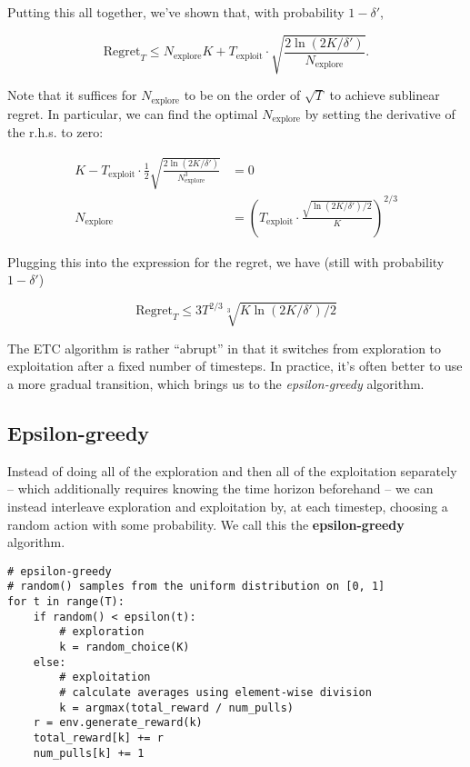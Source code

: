 \documentclass[../main/main]{subfiles}
\begin{document}
Putting this all together, we've shown that, with probability $1 - \delta'$,

\[
    \text{Regret}_T \le N_{\text{explore}} K + T_{\text{exploit}} \cdot \sqrt{\frac{2\ln(2K/\delta')}{N_{\text{explore}}}}.
\]

Note that it suffices for $N_{\text{explore}}$ to be on the order of $\sqrt{T}$ to achieve sublinear regret. In particular, we can find the optimal $N_{\text{explore}}$ by setting the derivative of the r.h.s. to zero:

\begin{align*}
    K - T_{\text{exploit}} \cdot \frac{1}{2} \sqrt{\frac{2\ln(2K/\delta')}{N_{\text{explore}}^3}} &= 0 \\
    N_{\text{explore}} &= \left( T_{\text{exploit}} \cdot \frac{\sqrt{\ln(2K/\delta')/2}}{K} \right)^{2/3}
\end{align*}

Plugging this into the expression for the regret, we have (still with probability $1-\delta'$)

\[
    \text{Regret}_T \le 3 T^{2/3} \sqrt[3]{K \ln(2K/\delta') / 2}
\]

The ETC algorithm is rather ``abrupt'' in that it switches from exploration to exploitation after a fixed number of timesteps. In practice, it's often better to use a more gradual transition, which brings us to the \emph{epsilon-greedy} algorithm.

\subsection{Epsilon-greedy}

Instead of doing all of the exploration and then all of the exploitation separately -- which additionally requires knowing the time horizon beforehand -- we can instead interleave exploration and exploitation by, at each timestep, choosing a random action with some probability. We call this the \textbf{epsilon-greedy} algorithm.

\begin{lstlisting}
# epsilon-greedy
# random() samples from the uniform distribution on [0, 1]
for t in range(T):
    if random() < epsilon(t):
        # exploration
        k = random_choice(K)
    else:
        # exploitation
        # calculate averages using element-wise division
        k = argmax(total_reward / num_pulls)
    r = env.generate_reward(k)
    total_reward[k] += r
    num_pulls[k] += 1
\end{lstlisting}
\end{document}
